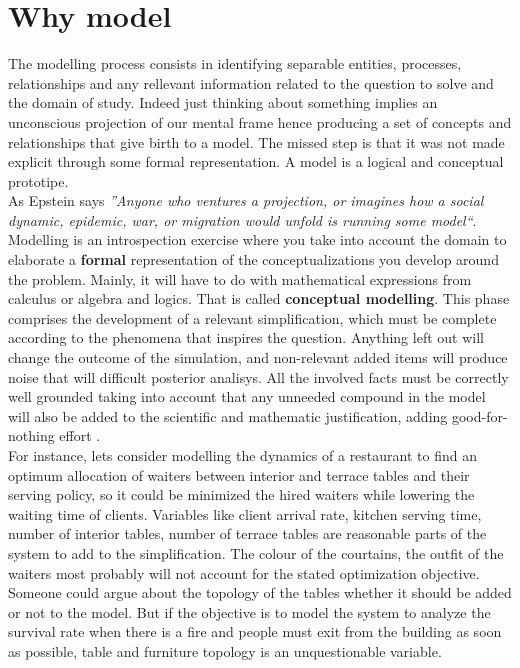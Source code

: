 \documentclass[11pt,oneside,a4paper,openright]{report}
\begin{document}
\section{Why model}
%
The modelling process consists in identifying separable entities, processes, relationships and any rellevant information related to the question to solve and the domain of study. Indeed just thinking about something implies an unconscious projection of our mental frame hence producing a set of concepts and relationships that give birth to a model. The missed step is that it was not made explicit through some formal representation. A model is a logical and conceptual prototipe.\\
As Epstein \cite{Epstein2008} says \textit{''Anyone who ventures a projection, or imagines how a social dynamic, epidemic, war, or migration would unfold is running some model``}.\\
Modelling is an introspection exercise where you take into account the domain to elaborate a \textbf{formal} representation of the conceptualizations you develop around the problem. Mainly, it will have to do with mathematical expressions from calculus or algebra and logics. That is called \textbf{conceptual modelling}. This phase comprises the development of a relevant simplification, which must be complete according to the phenomena that inspires the question. Anything left out will change the outcome of the simulation, and non-relevant added items will produce noise that will difficult posterior analisys. All the involved facts must be correctly well grounded taking into account that any unneeded compound in the model will also be added to the scientific and mathematic justification, adding good-for-nothing effort \cite{Epstein2008}.\\
For instance, lets consider modelling the dynamics of a restaurant to find an optimum allocation of waiters between interior and terrace tables and their serving policy, so it could be minimized the hired waiters while lowering the waiting time of clients. Variables like client arrival rate, kitchen serving time, number of interior tables, number of terrace tables are reasonable parts of the system to add to the simplification. The colour of the courtains, the outfit of the waiters most probably will not account for the stated optimization objective. Someone could argue about the topology of the tables whether it should be added or not to the model. But if the objective is to model the system to analyze the survival rate when there is a fire and people must exit from the building as soon as possible, table and furniture topology is an unquestionable variable.\\
\end{document}

